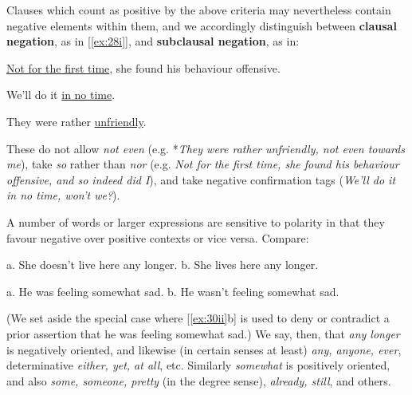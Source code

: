 Clauses which count as positive by the above criteria may nevertheless contain negative elements within them, and we accordingly distinguish between \textbf{clausal negation}, as in [\ref{ex:28i}], and \textbf{subclausal negation}, as in:
\begin{examples}
\item \label{ex:29}
    \begin{examples}
        \item \uline{Not for the first time}, she found his behaviour offensive.
        \item We'll do it \uline{in no time}.
        \item They were rather \uline{unfriendly}.
    \end{examples}
\end{examples}
These do not allow \textit{not even} (e.g. *\textit{They were rather unfriendly, not even towards me}), take \textit{so} rather than \textit{nor} (e.g. \textit{Not for the first time, she found his behaviour offensive, and so indeed did I}), and take negative confirmation tags (\textit{We'll do it in no time, won't we?}).

A number of words or larger expressions are sensitive to polarity in that they favour negative over positive contexts or vice versa. Compare:
\begin{examples}
\item \label{ex:30}
    \begin{examples}
        \item \label{ex:30i}
            \textnormal{a.} She doesn't live here any longer.\hspace{3em}
            \textnormal{b.} \ungram She lives here any longer.
        \item \label{ex:30ii}
            \textnormal{a.} He was feeling somewhat sad.\hspace{4.2em}
            \textnormal{b.} \ungram He wasn't feeling somewhat sad.
    \end{examples}
\end{examples}

(We set aside the special case where [\ref{ex:30ii}b] is used to deny or contradict a prior assertion that he was feeling somewhat sad.) We say, then, that \textit{any longer} is {negatively oriented}, and likewise (in certain senses at least) \textit{any, anyone, ever}, determinative \textit{either, yet, at all}, etc. Similarly \textit{somewhat} is {positively oriented}, and also \textit{some, someone, pretty} (in the degree sense), \textit{already, still}, and others.

